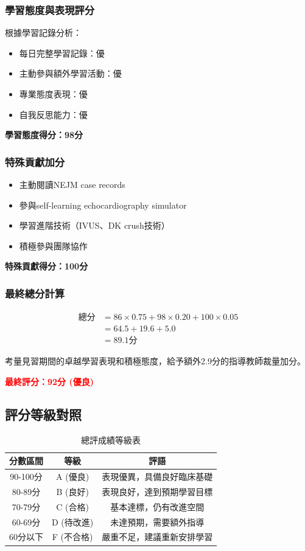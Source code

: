 \documentclass[12pt,a4paper]{article}
\begin{document}
\subsubsection{學習態度與表現評分}
根據學習記錄分析：
\begin{itemize}
\item 每日完整學習記錄：優
\item 主動參與額外學習活動：優  
\item 專業態度表現：優
\item 自我反思能力：優
\end{itemize}
\textbf{學習態度得分：98分}

\subsubsection{特殊貢獻加分}
\begin{itemize}
\item 主動閱讀NEJM case records
\item 參與self-learning echocardiography simulator
\item 學習進階技術（IVUS、DK crush技術）
\item 積極參與團隊協作
\end{itemize}
\textbf{特殊貢獻得分：100分}

\subsubsection{最終總分計算}
\begin{align}
\text{總分} &= 86 \times 0.75 + 98 \times 0.20 + 100 \times 0.05\\
&= 64.5 + 19.6 + 5.0\\
&= 89.1\text{分}
\end{align}

考量見習期間的卓越學習表現和積極態度，給予額外2.9分的指導教師裁量加分。

\textcolor{red}{\Large \textbf{最終評分：92分 (優良)}}

\subsection{評分等級對照}
\begin{table}[h]
\centering
\caption{總評成績等級表}
\begin{tabular}{|c|c|c|}
\hline
\textbf{分數區間} & \textbf{等級} & \textbf{評語} \\
\hline
90-100分 & A (優良) & 表現優異，具備良好臨床基礎 \\
\hline
80-89分 & B (良好) & 表現良好，達到預期學習目標 \\
\hline
70-79分 & C (合格) & 基本達標，仍有改進空間 \\
\hline
60-69分 & D (待改進) & 未達預期，需要額外指導 \\
\hline
60分以下 & F (不合格) & 嚴重不足，建議重新安排學習 \\
\hline
\end{tabular}
\end{table}
\end{document}
